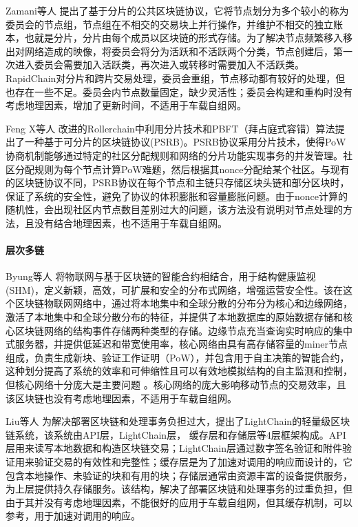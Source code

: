 Zamani等人 \cite{zamani2018rapidchain} 提出了基于分片的公共区块链协议，它将节点划分为多个较小的称为委员会的节点组，节点组在不相交的交易块上并行操作，并维护不相交的独立账本，也就是分片，分片由每个成员以区块链的形式存储。为了解决节点频繁移入移出对网络造成的映像，将委员会将分为活跃和不活跃两个分类，节点创建后，第一次进入委员会需要加入活跃类，再次进入或转移时需要加入不活跃类。RapidChain对分片和跨片交易处理，委员会重组，节点移动都有较好的处理，但也存在一些不足。委员会内节点数量固定，缺少灵活性；委员会构建和重构时没有考虑地理因素，增加了更新时间，不适用于车载自组网。

Feng X等人 \cite{feng2019pruneable} 改进的Rollerchain中利用分片技术和PBFT（拜占庭式容错）算法提出了一种基于可分片的区块链协议(PSRB)。PSRB协议采用分片技术，使得PoW协商机制能够通过特定的社区分配规则和网络的分片功能实现事务的并发管理。社区分配规则为每个节点计算PoW难题，然后根据其nonce分配给某个社区。与现有的区块链协议不同，PSRB协议在每个节点和主链只存储区块头链和部分区块时，保证了系统的安全性，避免了协议的体积膨胀和容量膨胀问题。由于nonce计算的随机性，会出现社区内节点数目差别过大的问题，该方法没有说明对节点处理的方法，且没有结合地理因素，也不适用于车载自组网。

\paragraph{层次多链}
Byung等人 \cite{jo2018hybrid} 将物联网与基于区块链的智能合约相结合，用于结构健康监视(SHM)，定义新颖，高效，可扩展和安全的分布式网络，增强运营安全性。该在这个区块链物联网网络中，通过将本地集中和全球分散的分布分为核心和边缘网络，激活了本地集中和全球分散分布的特征，并提供了本地数据库的原始数据存储和核心区块链网络的结构事件存储两种类型的存储。边缘节点充当查询实时响应的集中式服务器，并提供低延迟和带宽使用率，核心网络由具有高存储容量的miner节点组成，负责生成新块、验证工作证明（PoW），并包含用于自主决策的智能合约，这种划分提高了系统的效率和可伸缩性且可以有效地模拟结构的自主监测和控制，但核心网络十分庞大是主要问题 。核心网络的庞大影响移动节点的交易效率，且该区块链也没有考虑地理因素，不适用于车载自组网。

Liu等人 \cite{liu2019mathsf} 为解决部署区块链和处理事务负担过大，提出了LightChain的轻量级区块链系统，该系统由API层，LightChain层， 缓存层和存储层等4层框架构成。API层用来读写本地数据和构造区块链交易；LightChain层通过数字签名验证和附件验证用来验证交易的有效性和完整性；缓存层是为了加速对调用的响应而设计的，它包含本地操作、未验证的块和有用的块；存储层通常由资源丰富的设备提供服务，为上层提供持久存储服务。该结构，解决了部署区块链和处理事务的过重负担，但由于其并没有考虑地理因素，不能很好的应用于车载自组网，但其缓存机制，可以参考，用于加速对调用的响应。

